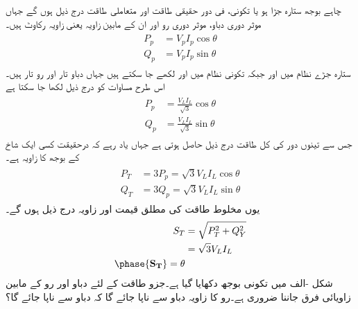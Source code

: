 چاہے بوجھ ستارہ جڑا ہو یا تکونی، فی دور حقیقی طاقت اور  متعاملی طاقت درج ذیل ہوں گے جہاں  موثر دوری دباو،  موثر دوری رو اور  ان کے مابین زاویہ یعنی زاویہ رکاوٹ  ہیں۔
\begin{gather}
\begin{aligned}\label{مساوات_تین_طاقت_حقیقی-متعاملی_الف}
P_p&=V_p I_p \cos \theta\\
Q_p&=V_p I_p \sin \theta
\end{aligned}
\end{gather} 
ستارہ جڑے نظام میں  اور  جبکہ تکونی نظام میں  اور  لکھے جا سکتے ہیں جہاں  دباو تار اور  رو تار ہیں۔ اس طرح  مساوات  کو درج ذیل لکھا جا سکتا ہے
\begin{gather}
\begin{aligned}\label{مساوات_تین_طاقت_حقیقی-متعاملی_ب}
P_p&=\frac{V_L I_L}{\sqrt{3}} \cos \theta\\
Q_p&=\frac{V_L I_L}{\sqrt{3}} \sin \theta
\end{aligned}
\end{gather}
جس سے تینوں دور کی کل طاقت درج ذیل حاصل ہوتی ہے جہاں یاد رہے کہ  درحقیقت کسی ایک شاخ کے  بوجھ کا زاویہ  ہے۔
\begin{gather}
\begin{aligned}\label{مساوات_تین_طاقت_حقیقی-متعاملی_پ}
P_T&=3P_p=\sqrt{3}V_L I_L \cos \theta\\
Q_T&=3Q_p=\sqrt{3}V_L I_L \sin \theta
\end{aligned}
\end{gather}
یوں مخلوط طاقت کی مطلق قیمت اور زاویہ  درج ذیل ہوں گے۔
\begin{gather}
\begin{aligned}
S_T&=\sqrt{P^2_T+Q^2_Y}\\
&=\sqrt{3}V_L I_L\\
\phase{\bf{S}_T}=\theta
\end{aligned}
\end{gather}
شکل -الف میں تکونی بوجھ دکھایا گیا ہے۔جزو طاقت کے لئے دباو اور رو کے مابین زاویائی فرق جاننا ضروری ہے۔رو  کا زاویہ  دباو  سے ناپا جائے گا کہ دباو  سے ناپا جائے گا؟
